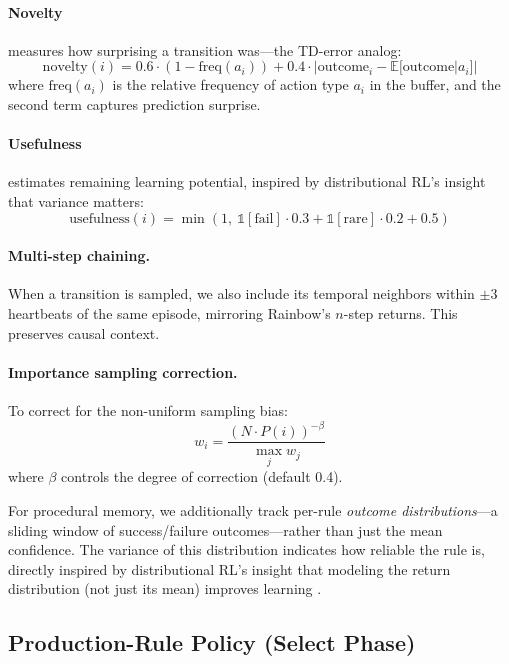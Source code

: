 \documentclass[letterpaper]{article}
\begin{document}
\paragraph{Novelty} measures how surprising a transition was---the TD-error analog:
\begin{equation}
  \text{novelty}(i) = 0.6 \cdot (1 - \text{freq}(a_i)) + 0.4 \cdot |\text{outcome}_i - \mathbb{E}[\text{outcome}|a_i]|
\end{equation}
where $\text{freq}(a_i)$ is the relative frequency of action type $a_i$ in the buffer, and the second term captures prediction surprise.

\paragraph{Usefulness} estimates remaining learning potential, inspired by distributional RL's insight that variance matters:
\begin{equation}
  \text{usefulness}(i) = \min\left(1, ~\mathbb{1}[\text{fail}] \cdot 0.3 + \mathbb{1}[\text{rare}] \cdot 0.2 + 0.5\right)
\end{equation}

\paragraph{Multi-step chaining.} When a transition is sampled, we also include its temporal neighbors within $\pm 3$ heartbeats of the same episode, mirroring Rainbow's $n$-step returns. This preserves causal context.

\paragraph{Importance sampling correction.} To correct for the non-uniform sampling bias:
\begin{equation}
  w_i = \frac{(N \cdot P(i))^{-\beta}}{\max_j w_j}
\end{equation}
where $\beta$ controls the degree of correction (default 0.4).

For procedural memory, we additionally track per-rule \emph{outcome distributions}---a sliding window of success/failure outcomes---rather than just the mean confidence. The variance of this distribution indicates how reliable the rule is, directly inspired by distributional RL's insight that modeling the return distribution (not just its mean) improves learning \citep{bellemare2017distributional}.

\subsection{Production-Rule Policy (Select Phase)}
\label{sec:policy}
\end{document}
